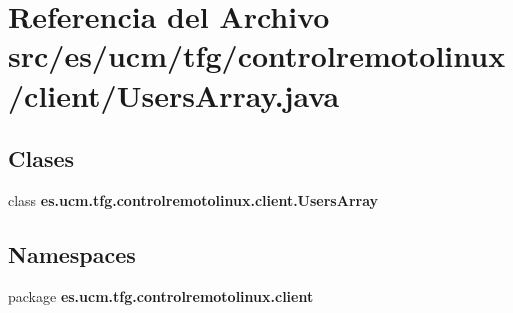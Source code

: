 \section{Referencia del Archivo src/es/ucm/tfg/controlremotolinux/client/\-Users\-Array.java}
\label{UsersArray_8java}
\subsection*{Clases}
\begin{DoxyCompactItemize}
\item 
class {\bf es.\-ucm.\-tfg.\-controlremotolinux.\-client.\-Users\-Array}
\end{DoxyCompactItemize}
\subsection*{Namespaces}
\begin{DoxyCompactItemize}
\item 
package {\bf es.\-ucm.\-tfg.\-controlremotolinux.\-client}
\end{DoxyCompactItemize}

